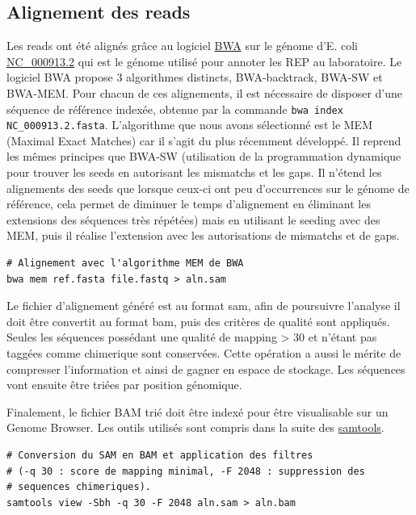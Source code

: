 \documentclass[12pt,a4paper]{report}
\begin{document}
\begin{onehalfspace}
\section*{Alignement des reads}
Les reads ont été alignés grâce au logiciel \href{http://bio-bwa.sourceforge.net/}{BWA} sur le génome d'E. coli \href{http://www.ncbi.nlm.nih.gov/nuccore/NC_000913.2}{NC\_000913.2} qui est le génome utilisé pour annoter les REP au laboratoire.  Le logiciel BWA propose 3 algorithmes distincts, BWA-backtrack, BWA-SW et BWA-MEM. Pour chacun de ces alignements, il est nécessaire de disposer d'une séquence de référence indexée, obtenue par la commande \texttt{bwa index NC\_000913.2.fasta}. 
L'algorithme que nous avons sélectionné est le MEM (Maximal Exact Matches) car il s'agit du plus récemment développé. Il reprend les mêmes principes que BWA-SW (utilisation de la programmation dynamique pour trouver les seeds en autorisant les mismatchs et les gaps. Il n'étend les alignements des seeds que lorsque ceux-ci ont peu d'occurrences sur le génome de référence, cela permet de diminuer le temps d'alignement en éliminant les extensions des séquences très répétées) mais en utilisant le seeding avec des MEM, puis il réalise l'extension avec les autorisations de mismatchs et de gaps.
\begin{lstlisting}[frame=single]
# Alignement avec l'algorithme MEM de BWA
bwa mem ref.fasta file.fastq > aln.sam
\end{lstlisting}
Le fichier d'alignement généré est au format \gls{sam}, afin de poursuivre l'analyse il doit être convertit au format \gls{bam}, puis des critères de qualité sont appliqués. Seules les séquences possédant une qualité de mapping > 30 et n'étant pas taggées comme \gls{chimerique} sont conservées. Cette opération a aussi le mérite de compresser l'information et ainsi de gagner en espace de stockage. Les séquences vont ensuite être triées par position génomique.

Finalement, le fichier BAM trié doit être indexé pour être visualisable sur un Genome Browser. Les outils utilisés sont compris dans la suite des \href{http://samtools.sourceforge.net/samtools.shtml}{samtools}.
\begin{lstlisting}[frame=single]
# Conversion du SAM en BAM et application des filtres
# (-q 30 : score de mapping minimal, -F 2048 : suppression des 
# sequences chimeriques).
samtools view -Sbh -q 30 -F 2048 aln.sam > aln.bam


\end{lstlisting}
\end{onehalfspace}
\end{document}
